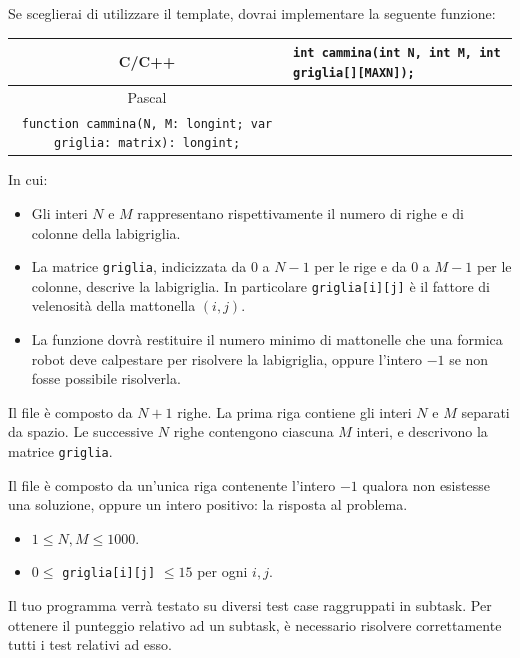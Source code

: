 Se sceglierai di utilizzare il template, dovrai implementare la seguente funzione:
\begin{center}\begin{tabularx}{\textwidth}{|c|X|}
\hline
C/C++  & \verb|int cammina(int N, int M, int griglia[][MAXN]);|\\
\hline
Pascal & \begin{tabular}[x]{@{}@{}}\verb|type matrix = array of array of longint;|\\ \verb|function cammina(N, M: longint; var griglia: matrix): longint;|\end{tabular}\\
\hline
\end{tabularx}\end{center}
In cui:
\begin{itemize}[nolistsep]
  \item Gli interi $N$ e $M$ rappresentano rispettivamente il numero di righe e di colonne della labigriglia.
  \item La matrice \texttt{griglia}, indicizzata da $0$ a $N-1$ per le rige e da $0$ a $M-1$ per le colonne, descrive la labigriglia. In particolare \texttt{griglia[i][j]} è il fattore di velenosità della mattonella $(i, j)$.
  \item La funzione dovrà restituire il numero minimo di mattonelle che una formica robot deve calpestare per risolvere la labigriglia, oppure l'intero $-1$ se non fosse possibile risolverla.
\end{itemize}

\InputFile
Il file  è composto da $N+1$ righe. La prima riga contiene gli interi $N$ e $M$ separati da spazio. Le successive $N$ righe contengono ciascuna $M$ interi, e descrivono la matrice \texttt{griglia}.

\OutputFile
Il file \outputfile{} è composto da un'unica riga contenente l'intero $-1$ qualora non esistesse una soluzione, oppure un intero positivo: la risposta al problema.

\Constraints
\begin{itemize}[nolistsep, itemsep=2mm]
	\item $1 \le N, M \le 1000$.
	\item $0 \le$ \texttt{griglia[i][j]} $\le 15$ per ogni $i, j$.
\end{itemize}

\Scoring
Il tuo programma verrà testato su diversi test case raggruppati in subtask.
Per ottenere il punteggio relativo ad un subtask, è necessario risolvere
correttamente tutti i test relativi ad esso.

